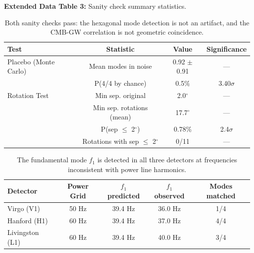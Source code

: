 \documentclass[11pt,a4paper]{article}
\begin{document}
\textbf{Extended Data Table 3:} Sanity check summary statistics.

\begin{table}[h]
\centering
\begin{tabular}{lccc}
\hline
Test & Statistic & Value & Significance \\
\hline
Placebo (Monte Carlo) & Mean modes in noise & 0.92 $\pm$ 0.91 & --- \\
& P(4/4 by chance) & 0.5\% & 3.40$\sigma$ \\
\hline
Rotation Test & Min sep. original & 2.0$^\circ$ & --- \\
& Min sep. rotations (mean) & 17.7$^\circ$ & --- \\
& P(sep $\leq$ 2$^\circ$) & 0.78\% & 2.4$\sigma$ \\
& Rotations with sep $\leq$ 2$^\circ$ & 0/11 & --- \\
\hline
\end{tabular}
\caption*{Both sanity checks pass: the hexagonal mode detection is not an artifact, and the CMB-GW correlation is not geometric coincidence.}
\end{table}

\begin{table}[h]
\centering
\begin{tabular}{lcccc}
\hline
Detector & Power Grid & $f_1$ predicted & $f_1$ observed & Modes matched \\
\hline
Virgo (V1) & 50 Hz & 39.4 Hz & 36.0 Hz & 1/4 \\
Hanford (H1) & 60 Hz & 39.4 Hz & 37.0 Hz & 4/4 \\
Livingston (L1) & 60 Hz & 39.4 Hz & 40.0 Hz & 3/4 \\
\hline
\end{tabular}
\caption*{The fundamental mode $f_1$ is detected in all three detectors at frequencies inconsistent with power line harmonics.}
\end{table}
\end{document}
